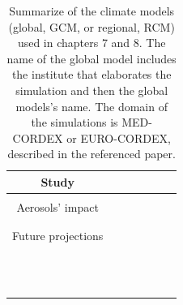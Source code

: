 \begin{table}[h!]
  \begin{tabular}{c|>{\raggedrigth}m{1cm}>{\raggedright}m{2cm}>{\raggedright}m{2cm}>{\raggedright}m{2cm}>{\raggedright}m{1.5cm}>{\raggedright}m{3cm}}
    \toprule 
    Study & \centering{Climate Model}  & &  \tabularnewline
    \midrule                                                         
    & \centering{GCM} & \centering{RCM} & \centering{Domain} & \centering{Resolution RCM} &\centering{Simulation} \tabularnewline                                            
    \midrule
     Aerosols' impact & \centering{CNRM-CM5} & \centering{CNRM-ALADIN53} & \centering{MED-CORDEX} & \centering{0.44º} & \centering{AER}\midrule\\
    \centering{NO-AER}\midrule\\
    \centering{TREND}
    \tabularnewline
   \midrule
    Future projections & \centering{CNRM-CM5} & \centering{ALADIN53}\midrule\\
    \centering{RCA4}\midrule\\
    \centering{CCLM4}\midrule & \centering{EURO-CORDEX} & \centering{0.11º} & \centering{HIST/RCP8.5}\\
    \centering{HIST/RCP8.5}\\
    \centering{HIST/RCP8.5}
    \tabularnewline
          & \centering{ICHEC-EC-EARTH} & \centering{RACMO}\midrule\\
    \centering{RCA4}\midrule\\
    \centering{CCLM4}\midrule & \centering{EURO-CORDEX} & \centering{0.11º} & \centering{HIST/RCP8.5}\\
    \centering{HIST/RCP8.5}\\
    \centering{HIST/RCP8.5}
    \tabularnewline
          & \centering{CNRM-CM5} & \centering{ALADIN-RCSM4}\midrule\\
    \centering{RCA4}\midrule & \centering{MED-CORDEX} & \centering{0.44º} & \centering{HIST/RCP4.5}\\
    \centering{HIST/RCP8.5}
    \tabularnewline
 \bottomrule
  \end{tabular}
  \caption[Summary of the climate models (global, GCM, or regional, RCM) used in chapters 7 and 8]{Summarize of the climate models (global, GCM, or regional, RCM) used in chapters 7 and 8. The name of the global model includes the institute that elaborates the simulation and then the global models's name. The domain of the simulations is MED-CORDEX or EURO-CORDEX, described in the referenced paper.}
  \label{climatemodels}
\end{table}
 

